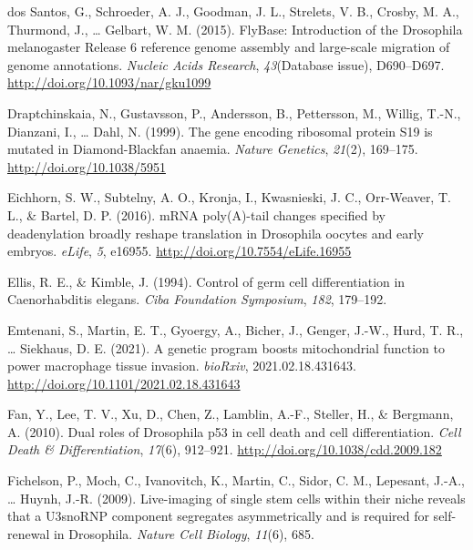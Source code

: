\documentclass[12pt,twoside]{reedthesis}
\newlength{\cslhangindent}
\newenvironment{cslreferences}%
  {\setlength{\parindent}{0pt}%
  \everypar{\setlength{\hangindent}{\cslhangindent}}\ignorespaces}%
  {\par}
\begin{document}
\begin{cslreferences}
\leavevmode\hypertarget{ref-dossantosFlyBaseIntroductionDrosophila2015}{}%
dos Santos, G., Schroeder, A. J., Goodman, J. L., Strelets, V. B., Crosby, M. A., Thurmond, J., \ldots{} Gelbart, W. M. (2015). FlyBase: Introduction of the Drosophila melanogaster Release 6 reference genome assembly and large-scale migration of genome annotations. \emph{Nucleic Acids Research}, \emph{43}(Database issue), D690--D697. \url{http://doi.org/10.1093/nar/gku1099}

\leavevmode\hypertarget{ref-draptchinskaiaGeneEncodingRibosomal1999}{}%
Draptchinskaia, N., Gustavsson, P., Andersson, B., Pettersson, M., Willig, T.-N., Dianzani, I., \ldots{} Dahl, N. (1999). The gene encoding ribosomal protein S19 is mutated in Diamond-Blackfan anaemia. \emph{Nature Genetics}, \emph{21}(2), 169--175. \url{http://doi.org/10.1038/5951}

\leavevmode\hypertarget{ref-Eichhorn2016n}{}%
Eichhorn, S. W., Subtelny, A. O., Kronja, I., Kwasnieski, J. C., Orr-Weaver, T. L., \& Bartel, D. P. (2016). mRNA poly(A)-tail changes specified by deadenylation broadly reshape translation in Drosophila oocytes and early embryos. \emph{eLife}, \emph{5}, e16955. \url{http://doi.org/10.7554/eLife.16955}

\leavevmode\hypertarget{ref-Ellis1994d}{}%
Ellis, R. E., \& Kimble, J. (1994). Control of germ cell differentiation in Caenorhabditis elegans. \emph{Ciba Foundation Symposium}, \emph{182}, 179--192.

\leavevmode\hypertarget{ref-emtenaniGeneticProgramBoosts2021}{}%
Emtenani, S., Martin, E. T., Gyoergy, A., Bicher, J., Genger, J.-W., Hurd, T. R., \ldots{} Siekhaus, D. E. (2021). A genetic program boosts mitochondrial function to power macrophage tissue invasion. \emph{bioRxiv}, 2021.02.18.431643. \url{http://doi.org/10.1101/2021.02.18.431643}

\leavevmode\hypertarget{ref-fanDualRolesDrosophila2010}{}%
Fan, Y., Lee, T. V., Xu, D., Chen, Z., Lamblin, A.-F., Steller, H., \& Bergmann, A. (2010). Dual roles of Drosophila p53 in cell death and cell differentiation. \emph{Cell Death \& Differentiation}, \emph{17}(6), 912--921. \url{http://doi.org/10.1038/cdd.2009.182}

\leavevmode\hypertarget{ref-Fichelson2009a}{}%
Fichelson, P., Moch, C., Ivanovitch, K., Martin, C., Sidor, C. M., Lepesant, J.-A., \ldots{} Huynh, J.-R. (2009). Live-imaging of single stem cells within their niche reveals that a U3snoRNP component segregates asymmetrically and is required for self-renewal in Drosophila. \emph{Nature Cell Biology}, \emph{11}(6), 685.


\end{cslreferences}
\end{document}
